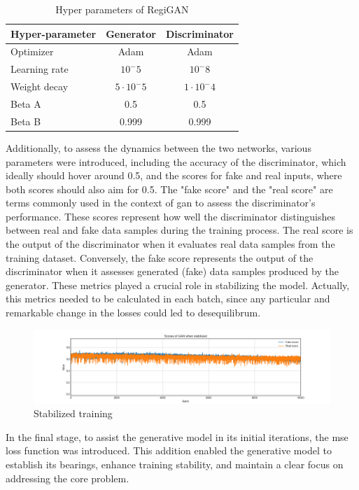 \begin{table}[H]
	\centering
	\caption{Hyper parameters of RegiGAN}
	\begin{tabular}{l|cc}
		Hyper-parameter & Generator & Discriminator\\\hline
		Optimizer & Adam & Adam\\
		Learning rate & $10^-5$ & $10^-8$\\
		Weight decay & $5 \cdot 10^-5$ & $1 \cdot 10^-4$\\
		Beta A & 0.5  & 0.5\\
		Beta B & 0.999 & 0.999
	\end{tabular}
\end{table} 
Additionally, to assess the dynamics between the two networks, various parameters were introduced, including the accuracy of the discriminator, which ideally should hover around 0.5, and the scores for fake and real inputs, where both scores should also aim for 0.5. The "fake score" and the "real score" are terms commonly used in the context of \gls{gan} to assess the discriminator's performance. These scores represent how well the discriminator distinguishes between real and fake data samples during the training process. The real score is the output of the discriminator when it evaluates real data samples from the training dataset. Conversely, the fake score represents the output of the discriminator when it assesses generated (fake) data samples produced by the generator. These metrics played a crucial role in stabilizing the model. Actually, this metrics needed to be calculated in each batch, since any particular and remarkable change in the losses could led to desequilibrum.
\begin{figure}[H]
	\centering
	\includegraphics[width=16cm]{imgs/models/models/cnn/gan-score.png}
	\caption{Stabilized training}
	\label{fig:models-carla-loss}
\end{figure}
In the final stage, to assist the generative model in its initial iterations, the \gls{mse} loss function was introduced. This addition enabled the generative model to establish its bearings, enhance training stability, and maintain a clear focus on addressing the core problem.
\\
